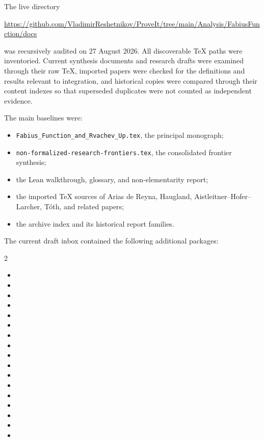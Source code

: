 \documentclass[11pt,oneside]{article}
\theoremstyle{definition}
\theoremstyle{remark}
\newcommand{\1}{\mathbf 1}
\begin{document}
The live directory
\begin{center}
\url{https://github.com/VladimirReshetnikov/ProveIt/tree/main/Analysis/FabiusFunction/docs}
\end{center}
was recursively audited on 27 August 2026.  All discoverable TeX paths were inventoried.  Current synthesis documents and research drafts were examined through their raw TeX, imported papers were checked for the definitions and results relevant to integration, and historical copies were compared through their content indexes so that superseded duplicates were not counted as independent evidence.

The main baselines were:
\begin{itemize}
\item \texttt{Fabius\_Function\_and\_Rvachev\_Up.tex}, the principal monograph;
\item \texttt{non-formalized-research-frontiers.tex}, the consolidated frontier synthesis;
\item the Lean walkthrough, glossary, and non-elementarity report;
\item the imported TeX sources of Arias de Reyna, Haugland, Aistleitner--Hofer--Larcher, T\'oth, and related papers;
\item the archive index and its historical report families.
\end{itemize}

The current draft inbox contained the following additional packages:
\begin{multicols}{2}\small
\begin{itemize}
\item {}
\item {}
\item {}
\item {}
\item {}
\item {}
\item {}
\item {}
\item {}
\item {}
\item {}
\item {}
\item {}
\item {}
\item {}
\item {}
\item {}
\end{itemize}
\end{multicols}
\end{document}
